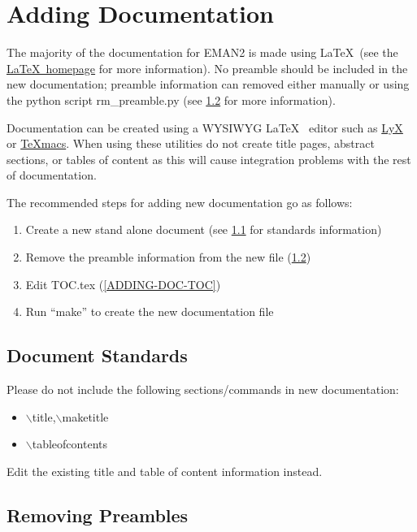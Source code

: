\section{Adding Documentation} 

The majority of the documentation for EMAN2 is made using \LaTeX ~(see the
\href{http://www.latex-project.org/}{\LaTeX ~homepage} for more
information).  No preamble should be included in the new
documentation; preamble information can removed either manually or
using the python script rm\_preamble.py (see \ref{ADDING-DOC-RMPRE}
for more information).  

Documentation can be created using a WYSIWYG \LaTeX ~ editor such as
\href{http://www.lyx.org/}{LyX} or
\href{http://www.www.texmacs.org/}{TeXmacs}.  When using these
utilities do not create title pages, abstract sections, or tables of
content as this will cause integration problems with the rest of
documentation.

The recommended steps for adding new documentation go as follows:
\begin{enumerate}
  \item Create a new stand alone document (see \ref{ADDING-DOC-STANDS}
  for standards information)
  \item Remove the preamble information from the new file
  (\ref{ADDING-DOC-RMPRE})
  \item Edit TOC.tex (\ref{ADDING-DOC-TOC})
  \item Run ``make'' to create the new documentation file
\end{enumerate}

\subsection{Document Standards} \label{ADDING-DOC-STANDS}
Please do not include the following sections/commands in new documentation:
\begin{itemize}
  \item
    {\color[named]{BurntOrange} $\backslash$title,$\backslash$maketitle}
  \item
    {\color[named]{BurntOrange} $\backslash$tableofcontents}
\end{itemize}
Edit the existing title and table of content information instead.


\subsection{Removing Preambles} \label{ADDING-DOC-RMPRE}

